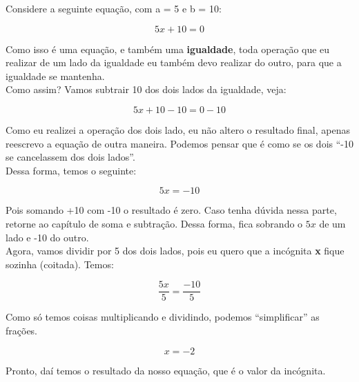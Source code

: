 \begin{exemplo}
    Considere a seguinte equação, com a = 5 e b = 10:

    \begin{equation}
        5 x + 10=0
    \label{eq_mud_lado_1}
    \end{equation}

    Como isso é uma equação, e também uma \textbf{igualdade}, toda operação que eu realizar de um lado da igualdade eu também devo realizar do outro, para que a igualdade se mantenha.\\

    Como assim? Vamos subtrair 10 dos dois lados da igualdade, veja:

    \begin{equation}
        5x+10-10=0-10
    \end{equation}

    Como eu realizei a operação dos dois lado, eu não altero o resultado final, apenas reescrevo a equação de outra maneira. Podemos pensar que é como se os dois ``-10 se cancelassem dos dois lados''. \\

    Dessa forma, temos o seguinte:

    \begin{equation}
        5x=-10
        \label{eq_mud_lado_2}
    \end{equation}

    Pois somando +10 com -10 o resultado é zero. Caso tenha dúvida nessa parte, retorne ao capítulo de soma e subtração. Dessa forma, fica sobrando o \(5x\) de um lado e -10 do outro.\\

    Agora, vamos dividir por 5 dos dois lados, pois eu quero que a incógnita \textbf{x} fique sozinha (coitada). Temos:

    \begin{equation}
        \frac{5x}{5}=\frac{-10}{5}
    \end{equation}

    Como só temos coisas multiplicando e dividindo, podemos ``simplificar'' as frações. 

    \begin{equation}
        x=-2
    \end{equation}

    Pronto, daí temos o resultado da nosso equação, que é o valor da incógnita.

    \label{ex_troca_lado}
\end{exemplo}

